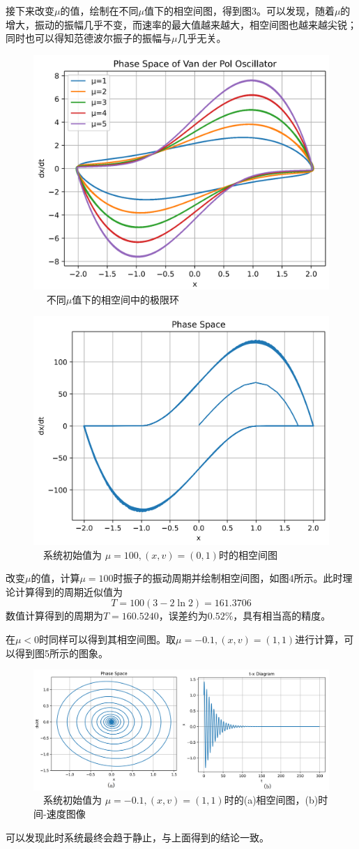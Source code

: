 \documentclass[10.5pt,oneside,a4paper]{article}
\theoremstyle{mystyle}
\begin{document}
接下来改变$\mu$的值，绘制在不同$\mu$值下的相空间图，得到图3。可以发现，随着$\mu$的增大，振动的振幅几乎不变，而速率的最大值越来越大，相空间图也越来越尖锐；
同时也可以得知范德波尔振子的振幅与$\mu$几乎无关。


\begin{figure}
    \centering
    \includegraphics[width=0.4\linewidth]{1-5.png}
    \caption{$\quad$ 不同$\mu$值下的相空间中的极限环}
\end{figure}

\begin{figure}
    \centering
    \includegraphics[width=0.5\linewidth]{100.png}
    \caption{$\quad$系统初始值为 $\mu=100, (x,v)=(0,1)$时的相空间图}
\end{figure}

改变$\mu$的值，计算$\mu=100$时振子的振动周期并绘制相空间图，如图4所示。此时理论计算得到的周期近似值为
\begin{equation}
    T=100(3-2\ln2)=161.3706
\end{equation}
数值计算得到的周期为$T=160.5240$，误差约为$0.52\%$，具有相当高的精度。

在$\mu<0$时同样可以得到其相空间图。取$\mu=-0.1, (x,v)=(1,1)$进行计算，可以得到图5所示的图象。
\begin{figure}
    \centering
    \includegraphics[width=0.8\linewidth]{xiaoyu.png}
    \caption{$\quad$系统初始值为 $\mu=-0.1, (x,v)=(1,1)$时的(a)相空间图，(b)时间-速度图像}
\end{figure}
可以发现此时系统最终会趋于静止，与上面得到的结论一致。
\end{document}
